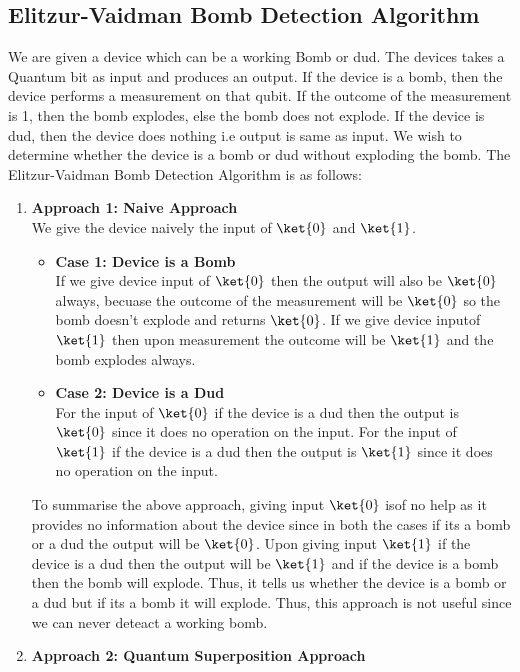 \documentclass[12pt, oneside]{book}
\theoremstyle{definition}
\theoremstyle{definition}
\theoremstyle{remark}
\begin{document}
\subsection{Elitzur-Vaidman Bomb Detection Algorithm}
We are given a device which can be a working Bomb or dud. The devices takes a Quantum bit as input and produces an output.
If the device is a bomb, then the device performs a measurement on that qubit. If the outcome of the measurement is 1, then the bomb explodes, else the bomb does not explode.
If the device is dud, then the device does nothing i.e output is same as input.
We wish to determine whether the device is a bomb or dud without exploding the bomb. The Elitzur-Vaidman Bomb Detection Algorithm is as follows:
\begin{enumerate}
    \item \textbf{Approach 1: Naive Approach }\\We give the device naively the input of $\ket{0}$ and $\ket{1}$. 
    \begin{itemize} 
        \item \textbf{Case 1: Device is a Bomb}\\
        If we give device input of $\ket{0}$ then the output will also be $\ket{0}$ always, becuase the outcome of the measurement will be $\ket{0}$ so the bomb doesn't explode and returns $\ket{0}$. 
        If we give device inputof $\ket{1}$ then upon measurement the outcome will be $\ket{1}$ and the bomb explodes always.
        \item \textbf{Case 2: Device is a Dud}\\
        For the input of $\ket{0}$ if the device is a dud then the output is $\ket{0}$ since it does no operation on the input.
        For the input of $\ket{1}$ if the device is a dud then the output is $\ket{1}$ since it does no operation on the input.
    \end{itemize}
    To summarise the above approach, giving input $\ket{0}$ isof no help as it provides no information about the device since in both the cases if its a bomb or a dud the output will be $\ket{0}$. 
    Upon giving input $\ket{1}$ if the device is a dud then the output will be $\ket{1}$ and if the device is a bomb then the bomb will explode. Thus, it tells us whether the device is a bomb or a dud but if its a bomb it will explode. Thus, this approach is not useful since we can never deteact a working bomb.
    \item \textbf{Approach 2: Quantum Superposition Approach}\\

\end{enumerate}
\end{document}

